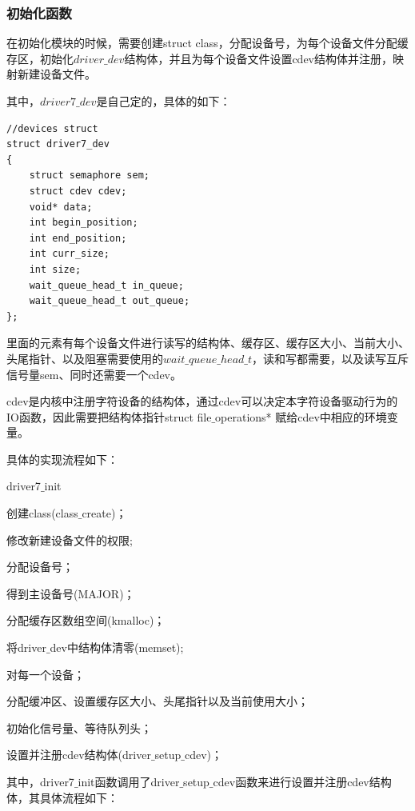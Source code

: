 \documentclass[UTF8]{ctexart}
\begin{document}
\subsubsection{初始化函数}
在初始化模块的时候，需要创建struct class，分配设备号，为每个设备文件分配缓存区，初始化$driver\_dev$结构体，并且为每个设备文件设置cdev结构体并注册，映射新建设备文件。\par
其中，$driver7\_dev$是自己定的，具体的如下：\par
\lstset{language = c}
\begin{lstlisting}
//devices struct
struct driver7_dev
{
	struct semaphore sem;
	struct cdev cdev;
	void* data;
	int begin_position;
	int end_position;
	int curr_size;
	int size;
	wait_queue_head_t in_queue;
	wait_queue_head_t out_queue;
};
\end{lstlisting}
里面的元素有每个设备文件进行读写的结构体、缓存区、缓存区大小、当前大小、头尾指针、以及阻塞需要使用的$wait\_queue\_head\_t$，读和写都需要，以及读写互斥信号量sem、同时还需要一个cdev。\par
cdev是内核中注册字符设备的结构体，通过cdev可以决定本字符设备驱动行为的IO函数，因此需要把结构体指针struct file$\_$operations* 赋给cdev中相应的环境变量。\par
具体的实现流程如下：\newpage
\begin{algorithm}
\caption{driver7$\_$init}
\begin{algorithmic}[1]
\STATE 创建class(class$\_$create)；\par
\STATE 修改新建设备文件的权限;\par
\STATE 分配设备号；\par
\STATE 得到主设备号(MAJOR)；\par
\STATE 分配缓存区数组空间(kmalloc)；\par
\STATE 将driver$\_$dev中结构体清零(memset);\par
\STATE 对每一个设备；\par
\STATE \qquad 分配缓冲区、设置缓存区大小、头尾指针以及当前使用大小；\par
\STATE \qquad 初始化信号量、等待队列头；\par
\STATE \qquad 设置并注册cdev结构体(driver$\_$setup$\_$cdev)；\par
\end{algorithmic}
\end{algorithm}
其中，driver7$\_$init函数调用了driver$\_$setup$\_$cdev函数来进行设置并注册cdev结构体，其具体流程如下：\par
\end{document}
